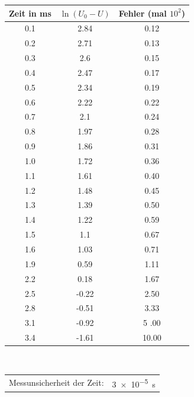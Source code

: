 \begin{figure}[h!]
	\centering
	\begin{tabular}{c|c|c}
		Zeit in \si{\milli\second}& $\ln(U_0-U)$ & Fehler (mal $10^2$)\\
		\hline
		0.1 &  2.84 &  0.12 \\
		0.2 &  2.71 &  0.13 \\
		0.3 &  2.6  &  0.15 \\
		0.4 &  2.47 &  0.17 \\
		0.5 &  2.34 &  0.19 \\
		0.6 &  2.22 &  0.22 \\
		0.7 &  2.1  &  0.24 \\
		0.8 &  1.97 &  0.28 \\
		0.9 &  1.86 &  0.31 \\
		1.0   &  1.72 &  0.36 \\
		1.1 &  1.61 &  0.40  \\
		1.2 &  1.48 &  0.45 \\
		1.3 &  1.39 &  0.50  \\
		1.4 &  1.22 &  0.59 \\
		1.5 &  1.1  &  0.67 \\
		1.6 &  1.03 &  0.71 \\
		1.9 &  0.59 &  1.11 \\
		2.2 &  0.18 &  1.67 \\
		2.5 & -0.22 &  2.50  \\
		2.8 & -0.51 &  3.33 \\
		3.1 & -0.92 &  5 .00   \\
		3.4 & -1.61 & 10.00    \\
	\end{tabular}
	\label{tab:aufladekurve}
	\\
	\vspace{1cm}
	\begin{tabular}{ll}
		Messunsicherheit der Zeit: & \SI{3e-5}{\second}
	\end{tabular}
\end{figure}



\clearpage
